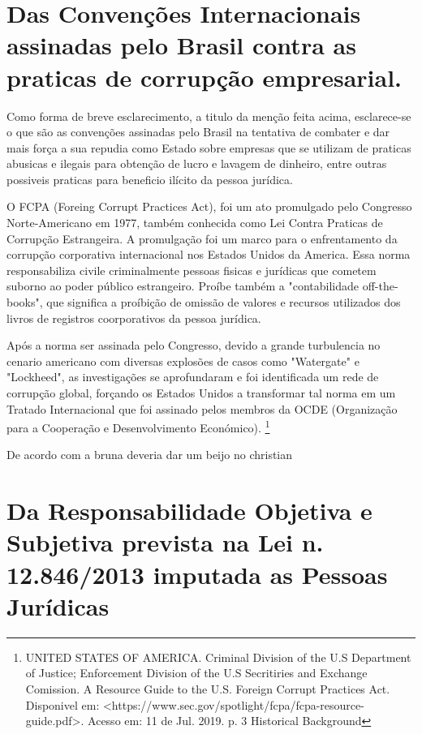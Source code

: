 \section{Das Convenções Internacionais assinadas pelo Brasil contra as praticas de corrupção empresarial.}

Como forma de breve esclarecimento, a titulo da menção feita acima, esclarece-se o que são as convenções assinadas pelo Brasil na tentativa de combater e dar mais força a sua repudia como Estado sobre empresas que se utilizam de praticas abusicas e ilegais para obtenção de lucro e lavagem de dinheiro, entre outras possiveis praticas para beneficio ilícito da pessoa jurídica. 

O FCPA (Foreing Corrupt Practices Act), foi um ato promulgado pelo Congresso Norte-Americano em 1977, também conhecida como Lei Contra Praticas de Corrupção Estrangeira. A promulgação foi um marco para o enfrentamento da corrupção corporativa internacional nos Estados Unidos da America. Essa norma responsabiliza civile criminalmente pessoas fisicas e jurídicas que cometem suborno ao poder público estrangeiro. Proíbe também a "contabilidade off-the-books", que significa a proíbição de omissão de valores e recursos utilizados dos livros de registros coorporativos da pessoa jurídica.

Após a norma ser assinada pelo Congresso, devido a grande turbulencia no cenario americano com diversas explosões de casos como "Watergate" e "Lockheed", as investigações se aprofundaram e foi identificada um rede de corrupção global, forçando os Estados Unidos a transformar tal norma em um Tratado Internacional que foi assinado pelos membros da OCDE (Organização para a Cooperação e Desenvolvimento Económico). \footnote{UNITED STATES OF AMERICA. Criminal Division of the U.S Department of Justice; Enforcement Division of the U.S Secritiries and Exchange Comission. A Resource Guide to the U.S. Foreign Corrupt Practices Act. Disponivel em: <https://www.sec.gov/spotlight/fcpa/fcpa-resource-guide.pdf>. Acesso em: 11 de Jul. 2019. p. 3 Historical Background} 

De acordo com \cite{blank2011embrace} a bruna deveria dar um beijo no christian


\section{Da Responsabilidade Objetiva e Subjetiva prevista na Lei n. 12.846/2013 imputada as Pessoas Jurídicas }



